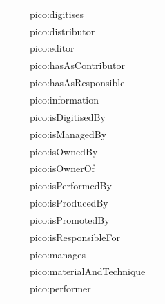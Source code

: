 \documentclass[epsfig,a4paper,12pt,titlepage]{book}
\begin{document}
\begin{center}
\begin{table}[h]
\begin{adjustbox}{width=\textwidth}
\begin{tabular}{|p{3.5cm}|p{3.5cm}|p{4.8cm}|p{3.8cm}|}
                     &                      & pico:digitises                &                                 \\
                     &                      & pico:distributor              &                                 \\
                     &                      & pico:editor                   &                                 \\
                     &                      & pico:hasAsContributor         &                                 \\
                     &                      & pico:hasAsResponsible         &                                 \\
                     &                      & pico:information              &                                 \\
                     &                      & pico:isDigitisedBy            &                                 \\
                     &                      & pico:isManagedBy              &                                 \\
                     &                      & pico:isOwnedBy                &                                 \\
                     &                      & pico:isOwnerOf                &                                 \\
                     &                      & pico:isPerformedBy            &                                 \\
                     &                      & pico:isProducedBy             &                                 \\
                     &                      & pico:isPromotedBy             &                                 \\
                     &                      & pico:isResponsibleFor         &                                 \\
                     &                      & pico:manages                  &                                 \\
                     &                      & pico:materialAndTechnique     &                                 \\
                     &                      & pico:performer                &                                 \\

\end{tabular}
\end{adjustbox}
\end{table}
\end{center}
\end{document}
